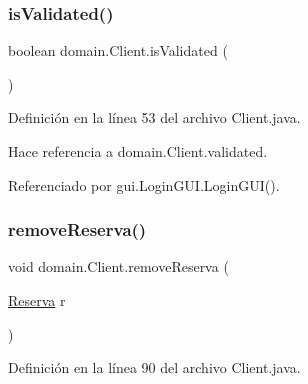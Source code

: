 \mbox{\label{classdomain_1_1_client_aa1343221f2098ed1fa6c41cec0aa59a4}} 
\subsubsection{\texorpdfstring{isValidated()}{isValidated()}}
{\footnotesize\ttfamily boolean domain.\+Client.\+is\+Validated (\begin{DoxyParamCaption}{ }\end{DoxyParamCaption})}



Definición en la línea 53 del archivo Client.\+java.


\begin{DoxyCode}{0}

\end{DoxyCode}


Hace referencia a domain.\+Client.\+validated.



Referenciado por gui.\+Login\+G\+U\+I.\+Login\+G\+U\+I().

\mbox{\label{classdomain_1_1_client_a1be8ad60fb1d03ec9895640d87ab5576}} 
\subsubsection{\texorpdfstring{removeReserva()}{removeReserva()}}
{\footnotesize\ttfamily void domain.\+Client.\+remove\+Reserva (\begin{DoxyParamCaption}\item[{\mbox{\hyperlink{classdomain_1_1_reserva}{Reserva}}}]{r }\end{DoxyParamCaption})}



Definición en la línea 90 del archivo Client.\+java.


\begin{DoxyCode}{0}

\end{DoxyCode}


